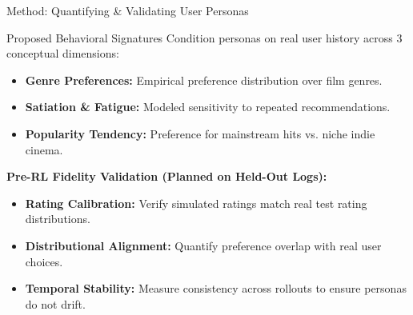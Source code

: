 \documentclass[handout]{beamer}
\begin{document}
\begin{frame}{Method: Quantifying \& Validating User Personas}
  \begin{block}{Proposed Behavioral Signatures}
    \small
    Condition personas on real user history across 3 conceptual dimensions:
    \begin{itemize}
      \item \textbf{Genre Preferences:} Empirical preference distribution over film genres.
      \item \textbf{Satiation \& Fatigue:} Modeled sensitivity to repeated recommendations.
      \item \textbf{Popularity Tendency:} Preference for mainstream hits vs. niche indie cinema.
    \end{itemize}
  \end{block}

  \pause
  \vspace{0.02cm}

  {\textbf{\textcolor{PomonaNavy}{Pre-RL Fidelity Validation (Planned on Held-Out Logs):}}}
  \small
  \begin{itemize}
    \item \textbf{Rating Calibration:} Verify simulated ratings match real test rating distributions.
    \item \textbf{Distributional Alignment:} Quantify preference overlap with real user choices.
    \item \textbf{Temporal Stability:} Measure consistency across rollouts to ensure personas do not drift.
  \end{itemize}
\end{frame}
\end{document}
